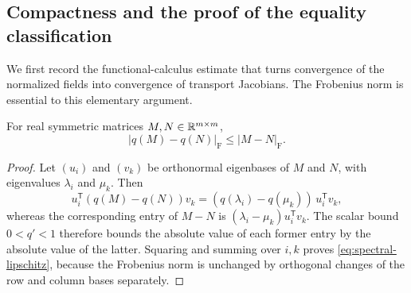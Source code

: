\subsection{Compactness and the proof of the equality classification}

We first record the functional-calculus estimate that turns convergence
of the normalized fields into convergence of transport Jacobians.  The
Frobenius norm is essential to this elementary argument.

\begin{lemma}\label{lem:spectral-lipschitz}
For real symmetric matrices $M,N\in\mathbb R^{m\times m}$,
\begin{equation}\label{eq:spectral-lipschitz}
  |q(M)-q(N)|_{\mathrm F}\le |M-N|_{\mathrm F}.
\end{equation}
\end{lemma}

\begin{proof}
Let $(u_i)$ and $(v_k)$ be orthonormal eigenbases of $M$ and $N$, with
eigenvalues $\lambda_i$ and $\mu_k$.  Then
\[
  u_i^{\mathsf T}(q(M)-q(N))v_k
   =(q(\lambda_i)-q(\mu_k))\,u_i^{\mathsf T}v_k,
\]
whereas the corresponding entry of $M-N$ is
$(\lambda_i-\mu_k)u_i^{\mathsf T}v_k$.  The scalar bound $0<q'<1$
therefore bounds the absolute value of each former entry by the absolute
value of the latter.
Squaring and summing over $i,k$ proves \eqref{eq:spectral-lipschitz},
because the Frobenius norm is unchanged by orthogonal changes of the
row and column bases separately.
\end{proof}

